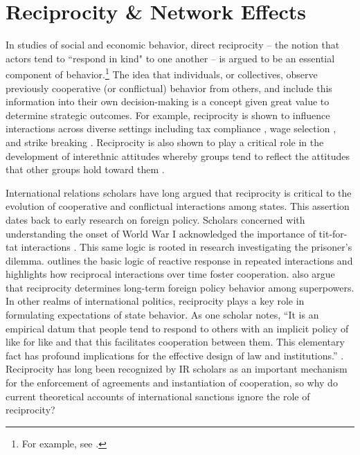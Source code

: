 \section*{Reciprocity \& Network Effects}
\label{neteffects}
In studies of social and economic behavior, direct reciprocity -- the notion that actors tend to ``respond in kind" to one another -- is argued to be an essential component of behavior.\footnote{For example, see \cite{bolton:1998, charness:2002, charness:2004, cox:2007, cox:2004}.} The idea that individuals, or collectives, observe previously cooperative (or conflictual) behavior from others, and include this information into their own decision-making is a concept given great value to determine strategic outcomes. For example, reciprocity is shown to influence interactions across diverse settings including tax compliance \citep{smith:1990}, wage selection \citep{campbell:1997}, and strike breaking \citep{brett:1998}. Reciprocity is also shown to play a critical role in the development of interethnic attitudes whereby groups tend to reflect the attitudes that other groups hold toward them \citep{berry:1979}. 

 International relations scholars have long argued that reciprocity is critical to the evolution of cooperative and conflictual interactions among states. This assertion dates back to early research on foreign policy. Scholars concerned with understanding the onset of World War I acknowledged the importance of tit-for-tat interactions \citep{holsti1972}. This same logic is rooted in research investigating the prisoner's dilemma. \cite{axelrod:1985} outlines the basic logic of reactive response in repeated interactions and highlights how reciprocal interactions over time foster cooperation. \cite{rajmaira:1990} also argue that reciprocity determines long-term foreign policy behavior among superpowers. In other realms of international politics, reciprocity plays a key role in formulating expectations of state behavior. As one scholar notes, ``It is an empirical datum that people tend to respond to others with an implicit policy of like for like and that this facilitates cooperation between them. This elementary fact has profound implications for the effective design of law and institutions.'' \cite[p. 19]{osiel:2009}. Reciprocity has long been recognized by IR scholars as an important mechanism for the enforcement of agreements and instantiation of cooperation, so why do current theoretical accounts of international sanctions ignore the role of reciprocity? 

